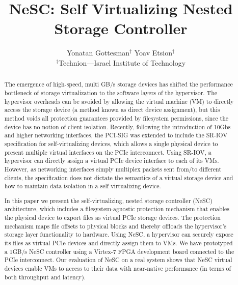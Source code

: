 \documentclass{sig-alternate}
\title{NeSC: Self Virtualizing Nested Storage Controller}
\begin{document}
\maketitle
\thispagestyle{firstpage}
\pagestyle{plain}


\author{
  {\rm
  Yonatan Gottesman$^{\dagger}$
  Yoav Etsion$^{\dagger}$}\\[0mm]
  $^\dagger$Technion---Israel Institute of Technology
}



\begin{abstract}
The emergence of high-speed, multi GB/s storage devices has shifted the performance bottleneck of storage virtualization to the software layers of the hypervisor. The hypervisor overheads can be avoided by allowing the virtual machine (VM) to directly access the storage device (a method known as direct device assignment), but this method voids all protection guarantees provided by  filesystem permissions, since the device has no notion of client isolation.
Recently, following the introduction of 10Gbs and higher networking interfaces, the PCI-SIG was extended to include the SR-IOV specification for self-virtualizing devices, which allows a single physical device to present multiple virtual interfaces on the PCIe interconnect. Using SR-IOV, a hypervisor can directly assign a virtual PCIe device interface to each of its VMs. However, as networking interfaces simply multiplex packets sent from/to different clients, the specification does not dictate the semantics of a virtual storage device and how to maintain data isolation in a self virtualizing device.



  In this paper we present the self-virtualizing, nested storage controller (NeSC) architecture, which includes a filesystem-agnostic protection mechanism that enables the physical device to export files as virtual PCIe storage devices. The protection mechanism maps file offsets to physical blocks and thereby offloads the hypervisor's storage layer functionality to hardware.
  Using NeSC, a hypervisor can securely expose its files as virtual PCIe devices and directly assign them to VMs.
  We have prototyped a 1GB/s NeSC controller using a Virtex-7 FPGA development board connected to the PCIe interconnect. 
  Our evaluation of NeSC on a real system shows that NeSC virtual devices enable VMs to access to their data with near-native performance (in terms of both throughput and latency).
\end{abstract}
\end{document}
